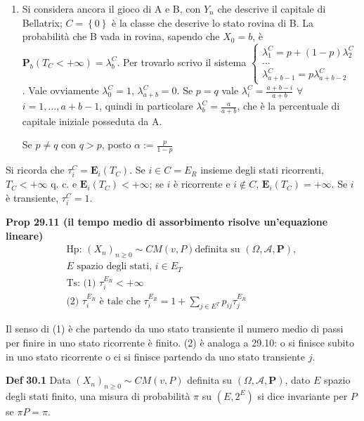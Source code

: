 \documentclass{article}
\begin{document}
\begin{enumerate}
\item Si considera ancora il gioco di A e B, con $Y_{n}$ che descrive il
capitale di Bellatrix; $C=\left\{ 0\right\} $ \`{e} la classe che descrive
lo stato rovina di B. La probabilit\`{a} che B vada in rovina, sapendo che $%
X_{0}=b$, \`{e} $\mathbf{P}_{b}\left( T_{C}<+\infty \right) =\lambda
_{b}^{C} $. Per trovarlo scrivo il sistema $\left\{ 
\begin{array}{c}
\lambda _{1}^{C}=p+\left( 1-p\right) \lambda _{2}^{C} \\ 
... \\ 
\lambda _{a+b-1}^{C}=p\lambda _{a+b-2}^{C}%
\end{array}%
\right. $. Vale ovviamente $\lambda _{0}^{C}=1$, $\lambda _{a+b}^{C}=0$. Se $%
p=q$ vale $\lambda _{i}^{C}=\frac{a+b-i}{a+b}$ $\forall $ $i=1,...,a+b-1$,
quindi in particolare $\lambda _{b}^{C}=\frac{a}{a+b}$, che \`{e} la
percentuale di capitale iniziale posseduta da A.

Se $p\neq q$ con $q>p$, posto $\alpha :=\frac{p}{1-p}$
\end{enumerate}

Si ricorda che $\tau _{i}^{C}=\mathbf{E}_{i}\left( T_{C}\right) $. Se $i\in
C=E_{R}$ insieme degli stati ricorrenti, $T_{C}<+\infty $ q. c. e $\mathbf{E}_{i}\left( T_{C}\right) <+\infty $; se $i$ \`{e}
ricorrente e $i\not\in C$, $\mathbf{E}_{i}\left( T_{C}\right) =+\infty $. Se 
$i$ \`{e} transiente, $\tau _{i}^{C}=1$.

\textbf{Prop 29.11 (il tempo medio di assorbimento risolve un'equazione
lineare)}%
\begin{gather*}
\text{Hp: }\left( X_{n}\right) _{n\geq 0}\sim CM\left( v,P\right) \text{
definita su }\left( \Omega ,\mathcal{A},\mathbf{P}\right) \text{, } \\
E\text{ spazio degli stati, }i\in E_{T} \\
\text{Ts: (1) }\tau _{i}^{E_{R}}<+\infty \\
\text{(2) }\tau _{i}^{E_{R}}\text{ \`{e} tale che }\tau
_{i}^{E_{R}}=1+\sum_{j\in E^{T}}p_{ij}\tau _{j}^{E_{R}}
\end{gather*}

Il senso di (1) \`{e} che partendo da uno stato transiente il numero medio
di passi per finire in uno stato ricorrente \`{e} finito. (2) \`{e} analoga
a 29.10: o si finisce subito in uno stato ricorrente o ci si finisce
partendo da uno stato transiente $j$.

\textbf{Def} \textbf{30.1} Data $\left( X_{n}\right) _{n\geq 0}\sim CM\left(
v,P\right) $ definita su $\left( \Omega ,\mathcal{A},\mathbf{P}\right) $,
dato $E$ spazio degli stati finito, una misura di probabilit\`{a} $\pi $ su $%
\left( E,2^{E}\right) $ si dice invariante per $P$ se $\pi P=\pi $.
\end{document}
